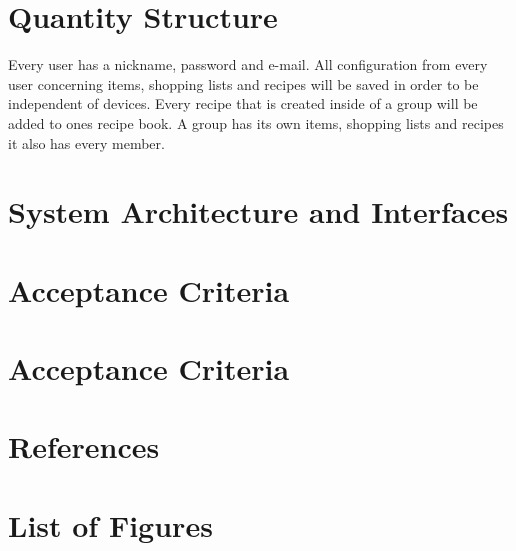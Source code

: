 \documentclass[12pt]{article}
\theoremstyle{definition}
\begin{document}
\pagebreak

\section{Quantity Structure}

Every user has a nickname, password and e-mail. All configuration from every user concerning items, shopping lists and recipes will be saved in order to be independent of devices. Every recipe that is created inside of a group will be added to ones recipe book. A group has its own items, shopping lists and recipes it also has every member. 

\pagebreak

\section{System Architecture and Interfaces}

\pagebreak

\section{Acceptance Criteria}

\pagebreak

\section{Acceptance Criteria}

\pagebreak

\section{References}

\pagebreak

\section{List of Figures}

\pagebreak
\end{document}
